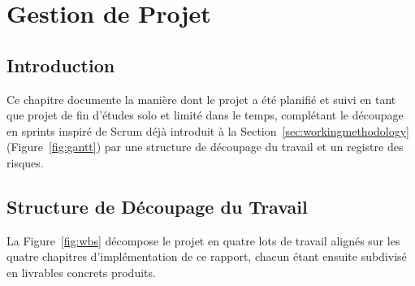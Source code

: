 \documentclass[12pt,a4paper,oneside]{report}
\begin{document}
\chapter{Gestion de Projet}\label{chap:pm}
\section{Introduction}
Ce chapitre documente la manière dont le projet a été planifié et suivi en tant que projet de fin d'études solo et limité dans le temps, complétant le découpage en sprints inspiré de Scrum déjà introduit à la Section~\ref{sec:workingmethodology} (Figure~\ref{fig:gantt}) par une structure de découpage du travail et un registre des risques.

\section{Structure de Découpage du Travail}
La Figure~\ref{fig:wbs} décompose le projet en quatre lots de travail alignés sur les quatre chapitres d'implémentation de ce rapport, chacun étant ensuite subdivisé en livrables concrets produits.
\end{document}
